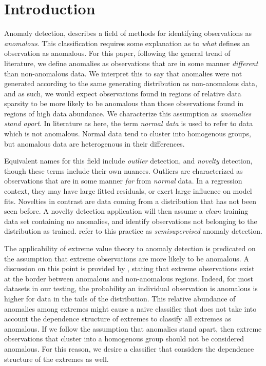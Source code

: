 \section{Introduction}

Anomaly detection, describes a field of methods for identifying observations as 
    \emph{anomalous}. This classification requires some explanation as to 
    \emph{what} defines an observation as anomalous. For this paper, following 
    the general trend of literature, we define anomalies as observations that 
    are in some manner \emph{different} than non-anomalous data. We interpret 
    this to say that anomalies were not generated according to the same 
    generating distribution as non-anomalous data, and as such, we would expect 
    observations found in regions of relative data sparsity to be more likely to 
    be anomalous than those observations found in regions of high data 
    abundance.  We characterize this assumption as \emph{anomalies stand apart}.
    In literature as here, the term \emph{normal data} is used to refer to data 
    which is not anomalous.  Normal data tend to cluster into homogenous groups, 
    but anomalous data are heterogenous in their differences. 
    
Equivalent names for this field include \emph{outlier} detection, and 
    \emph{novelty} detection, though these terms include their own nuances.
    Outliers are characterized as observations that are in some manner 
    \emph{far} from \emph{normal} data.  In a regression context, they may have
    large fitted residuals, or exert large influence on model fits.  Novelties
    in contrast are data coming from a distribution that has not been seen
    before.  A novelty detection application will then assume a \emph{clean} 
    training data set containing no anomalies, and identify observations not
    belonging to the distribution as trained.  \cite{Chandola2009} refer to 
    this practice as \emph{semisupervised} anomaly detection.

The applicability of extreme value theory to anomaly detection is predicated on 
    the assumption that extreme observations are more likely to be anomalous.  
    A discussion on this point is provided by \cite{goix2017}, stating that 
    extreme observations exist at the border between anomalous and non-anomalous 
    regions.  Indeed, for most datasets in our testing, the probability an 
    individual observation is anomalous is higher for data in the tails of the 
    distribution. This relative abundance of anomalies among extremes might 
    cause a naive classifier that does not take into account the dependence 
    structure of extremes to classify all extremes as anomalous.  If we follow 
    the assumption that anomalies stand apart, then extreme observations that 
    cluster into a homogenous group should not be considered anomalous.  For 
    this reason, we desire a classifier that considers the dependence structure 
    of the extremes as well.

